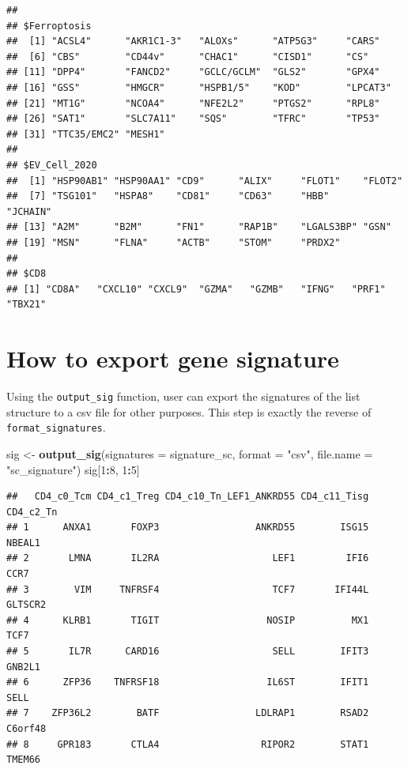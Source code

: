 \documentclass[
  12pt,
]{book}
\newenvironment{Shaded}{\begin{snugshade}}{\end{snugshade}}
\newcommand{\AttributeTok}[1]{\textcolor[rgb]{0.13,0.29,0.53}{#1}}
\newcommand{\DecValTok}[1]{\textcolor[rgb]{0.00,0.00,0.81}{#1}}
\newcommand{\FunctionTok}[1]{\textcolor[rgb]{0.13,0.29,0.53}{\textbf{#1}}}
\newcommand{\NormalTok}[1]{#1}
\newcommand{\OtherTok}[1]{\textcolor[rgb]{0.56,0.35,0.01}{#1}}
\newcommand{\SpecialCharTok}[1]{\textcolor[rgb]{0.81,0.36,0.00}{\textbf{#1}}}
\newcommand{\StringTok}[1]{\textcolor[rgb]{0.31,0.60,0.02}{#1}}
\begin{document}
\begin{verbatim}
## 
## $Ferroptosis
##  [1] "ACSL4"      "AKR1C1-3"   "ALOXs"      "ATP5G3"     "CARS"      
##  [6] "CBS"        "CD44v"      "CHAC1"      "CISD1"      "CS"        
## [11] "DPP4"       "FANCD2"     "GCLC/GCLM"  "GLS2"       "GPX4"      
## [16] "GSS"        "HMGCR"      "HSPB1/5"    "KOD"        "LPCAT3"    
## [21] "MT1G"       "NCOA4"      "NFE2L2"     "PTGS2"      "RPL8"      
## [26] "SAT1"       "SLC7A11"    "SQS"        "TFRC"       "TP53"      
## [31] "TTC35/EMC2" "MESH1"     
## 
## $EV_Cell_2020
##  [1] "HSP90AB1" "HSP90AA1" "CD9"      "ALIX"     "FLOT1"    "FLOT2"   
##  [7] "TSG101"   "HSPA8"    "CD81"     "CD63"     "HBB"      "JCHAIN"  
## [13] "A2M"      "B2M"      "FN1"      "RAP1B"    "LGALS3BP" "GSN"     
## [19] "MSN"      "FLNA"     "ACTB"     "STOM"     "PRDX2"   
## 
## $CD8
## [1] "CD8A"   "CXCL10" "CXCL9"  "GZMA"   "GZMB"   "IFNG"   "PRF1"   "TBX21"
\end{verbatim}

\hypertarget{how-to-export-gene-signature}{%
\section{How to export gene signature}\label{how-to-export-gene-signature}}

Using the \texttt{output\_sig} function, user can export the signatures of the list structure to a csv file for other purposes. This step is exactly the reverse of \texttt{format\_signatures}.

\begin{Shaded}
\begin{Highlighting}[]
\NormalTok{sig }\OtherTok{\textless{}{-}} \FunctionTok{output\_sig}\NormalTok{(}\AttributeTok{signatures =}\NormalTok{ signature\_sc, }\AttributeTok{format =} \StringTok{"csv"}\NormalTok{, }\AttributeTok{file.name =} \StringTok{"sc\_signature"}\NormalTok{)}
\NormalTok{sig[}\DecValTok{1}\SpecialCharTok{:}\DecValTok{8}\NormalTok{, }\DecValTok{1}\SpecialCharTok{:}\DecValTok{5}\NormalTok{]}
\end{Highlighting}
\end{Shaded}

\begin{verbatim}
##   CD4_c0_Tcm CD4_c1_Treg CD4_c10_Tn_LEF1_ANKRD55 CD4_c11_Tisg CD4_c2_Tn
## 1      ANXA1       FOXP3                 ANKRD55        ISG15    NBEAL1
## 2       LMNA       IL2RA                    LEF1         IFI6      CCR7
## 3        VIM     TNFRSF4                    TCF7       IFI44L   GLTSCR2
## 4      KLRB1       TIGIT                   NOSIP          MX1      TCF7
## 5       IL7R      CARD16                    SELL        IFIT3    GNB2L1
## 6      ZFP36    TNFRSF18                   IL6ST        IFIT1      SELL
## 7    ZFP36L2        BATF                 LDLRAP1        RSAD2   C6orf48
## 8     GPR183       CTLA4                  RIPOR2        STAT1    TMEM66
\end{verbatim}
\end{document}
